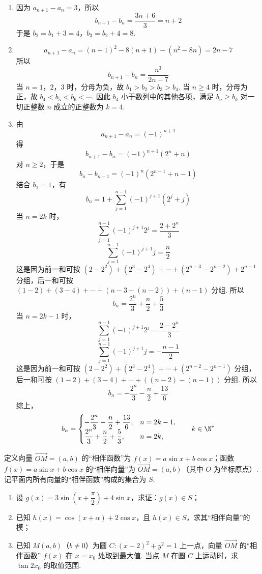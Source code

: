 \begin{solution}
\begin{enumerate}
\item 因为 \(a_{n+1}-a_n=3\)，所以
\[
b_{n+1}-b_n=\frac{3n+6}{3}=n+2
\]
于是 \(b_2=b_1+3=4\)，\(b_3=b_2+4=8\).

\item
\[
a_{n+1}-a_n=(n+1)^2-8(n+1)-(n^2-8n)=2n-7
\]
所以
\[
b_{n+1}-b_n=\frac{n^3}{2n-7}
\]
当 \(n=1\)，\(2\)，\(3\) 时，分母为负，故 \(b_1>b_2>b_3>b_4\). 当 \(n\ge4\) 时，分母为正，故 \(b_4<b_5<b_6<\cdots\). 因此 \(b_4\) 小于数列中的其他各项，满足 \(b_n\ge b_k\) 对一切正整数 \(n\) 成立的正整数为 \(k=4\).

\item 由
\[
a_{n+1}-a_n=(-1)^{n+1}
\]
得
\[
b_{n+1}-b_n=(-1)^{n+1}(2^n+n)
\]
对 \(n\ge2\)，于是
\[
b_n-b_{n-1}=(-1)^n\left(2^{n-1}+n-1\right)
\]
结合 \(b_1=1\)，有
\[
b_n=1+\sum_{j=1}^{n-1}(-1)^{j+1}(2^j+j)
\]
当 \(n=2k\) 时，
\[
\sum_{j=1}^{n-1}(-1)^{j+1}2^j=\frac{2+2^n}{3}
\]
\[
\sum_{j=1}^{n-1}(-1)^{j+1}j=\frac n2
\]
这是因为前一和可按 \((2-2^2)+(2^3-2^4)+\cdots+(2^{n-3}-2^{n-2})+2^{n-1}\) 分组，后一和可按 \((1-2)+(3-4)+\cdots+(n-3-(n-2))+(n-1)\) 分组.
所以
\[
b_n=\frac{2^n}{3}+\frac n2+\frac53
\]
当 \(n=2k-1\) 时，
\[
\sum_{j=1}^{n-1}(-1)^{j+1}2^j=\frac{2-2^n}{3}
\]
\[
\sum_{j=1}^{n-1}(-1)^{j+1}j=-\frac{n-1}{2}
\]
这是因为前一和可按 \((2-2^2)+(2^3-2^4)+\cdots+(2^{n-2}-2^{n-1})\) 分组，后一和可按 \((1-2)+(3-4)+\cdots+((n-2)-(n-1))\) 分组.
所以
\[
b_n=-\frac{2^n}{3}-\frac n2+\frac{13}{6}
\]
综上，
\[
b_n=
\begin{cases}
-\dfrac{2^n}{3}-\dfrac n2+\dfrac{13}{6},&n=2k-1,\\
\dfrac{2^n}{3}+\dfrac n2+\dfrac53,&n=2k,
\end{cases}
\qquad k\in\N^*
\]
\end{enumerate}
\end{solution}

\begin{problem}
定义向量 \(\overrightarrow{OM}=(a,b)\) 的“相伴函数”为 \(f(x)=a\sin x+b\cos x\)；函数 \(f(x)=a\sin x+b\cos x\) 的“相伴向量”为 \(\overrightarrow{OM}=(a,b)\)（其中 \(O\) 为坐标原点）. 记平面内所有向量的“相伴函数”构成的集合为 \(S\).

\begin{enumerate}
\item 设 \(g(x)=3\sin\left(x+\dfrac{\pi}{2}\right)+4\sin x\)，求证：\(g(x)\in S\)；
\item 已知 \(h(x)=\cos(x+\alpha)+2\cos x\)，且 \(h(x)\in S\)，求其“相伴向量”的模；
\item 已知 \(M(a,b)\)（\(b\ne0\)）为圆 \(C:(x-2)^2+y^2=1\) 上一点，向量 \(\overrightarrow{OM}\) 的“相伴函数” \(f(x)\) 在 \(x=x_0\) 处取到最大值. 当点 \(M\) 在圆 \(C\) 上运动时，求 \(\tan 2x_0\) 的取值范围.
\end{enumerate}
\end{problem}

